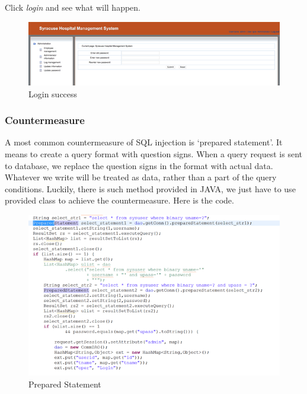 Click \emph{login} and see what will happen.
\begin{figure}[H]
    \centering
    \includegraphics[width=\textwidth]{sp/sp2.png}
    \caption{Login success}
    \label{fig:s2}
\end{figure}

\subsubsection{Countermeasure}
A most common countermeasure of SQL injection is ‘prepared statement’. It means to create a query format with question signs. When a query request is sent to database, we replace the question signs in the format with actual data. Whatever we write will be treated as data, rather than  a part of the query conditions. Luckily, there is such method provided in JAVA, we just have to use provided class to achieve the countermeasure. Here is the code.
\begin{figure}[H]
    \centering
    \includegraphics[width=\textwidth]{sp/sp3.png}
    \caption{Prepared Statement}
    \label{fig:s3}
\end{figure}
 
